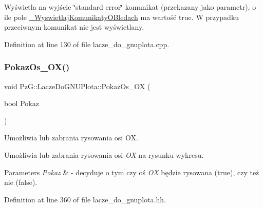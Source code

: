 Wyświetla na wyjście \char`\"{}standard error\char`\"{} komunikat (przekazany jako parametr), o ile pole \hyperlink{class_pz_g_1_1_lacze_do_g_n_u_plota_a2f2800f14ebfe1caef0b4d30c410a7fe}{\+\_\+\+Wyswietlaj\+Komunikaty\+O\+Bledach} ma wartość {\ttfamily true}. W przypadku przeciwnym komunikat nie jest wyświetlany. 

Definition at line 130 of file lacze\+\_\+do\+\_\+gnuplota.\+cpp.

\mbox{\label{class_pz_g_1_1_lacze_do_g_n_u_plota_a11421d7c67deab6b7524cc492407e897}} 
\subsubsection{\texorpdfstring{Pokaz\+Os\+\_\+\+O\+X()}{PokazOs\_OX()}\hspace{0.1cm}{\footnotesize\ttfamily [1/2]}}
{\footnotesize\ttfamily void Pz\+G\+::\+Lacze\+Do\+G\+N\+U\+Plota\+::\+Pokaz\+Os\+\_\+\+OX (\begin{DoxyParamCaption}\item[{bool}]{Pokaz }\end{DoxyParamCaption})\hspace{0.3cm}{\ttfamily [inline]}}



Umożliwia lub zabrania rysowania osi OX. 

Umożliwia lub zabrania rysowania osi {\itshape OX} na rysunku wykresu. 
\begin{DoxyParams}{Parameters}
{\em Pokaz} & -\/ decyduje o tym czy oś {\itshape OX} będzie rysowana ({\ttfamily true}), czy też nie ({\ttfamily false}). \\
\hline
\end{DoxyParams}


Definition at line 360 of file lacze\+\_\+do\+\_\+gnuplota.\+hh.

\mbox{\label{class_pz_g_1_1_lacze_do_g_n_u_plota_ae112972af57167c3b053bf922bce6bbf}} 
